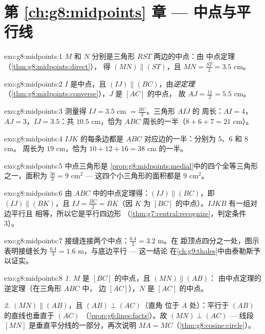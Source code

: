 \section*{第 \ref{ch:g8:midpoints} 章 --- 中点与平行线}

\begin{solution}{exo:g8:midpoints:1}
$M$ 和 $N$ 分别是三角形 $RST$ 两边的中点：由
中点定理（\cref{thm:g8:midpoints:direct}），
得 $(MN) \parallel (ST)$，且 $MN = \frac{ST}{2} = 3.5$ cm。
\end{solution}

\begin{solution}{exo:g8:midpoints:2}
$I$ 是中点，且 $(IJ) \parallel (BC)$，由\emph{逆定理}
（\cref{thm:g8:midpoints:converse}），$J$ 是 $[AC]$ 的中点，
故 $AJ = \frac{11}{2} = 5.5$ cm。
\end{solution}

\begin{solution}{exo:g8:midpoints:3}
测量得 $IJ = 3.5$ cm $= \frac{BC}{2}$。三角形 $AIJ$ 的
周长：$AI = 4$，$AJ = 3$，$IJ = 3.5$：共 $10.5$ cm，恰为
$ABC$ 周长的一半（$8 + 6 + 7 = 21$ cm）。
\end{solution}

\begin{solution}{exo:g8:midpoints:4}
$IJK$ 的每条边都是 $ABC$ 对应边的一半：分别为 $5$、$6$ 和 $8$ cm。
周长为 $19$ cm，恰为 $10 + 12 + 16 = 38$ cm 的一半。
\end{solution}

\begin{solution}{exo:g8:midpoints:5}
中点三角形是
\cref{prop:g8:midpoints:medial}中的四个全等三角形之一，面积为 $\frac{36}{4} = 9$ cm$^2$ ---
这四个小三角形的面积都是 $9$ cm$^2$。
\end{solution}

\begin{solution}{exo:g8:midpoints:6}
由 $ABC$ 中的中点定理得：$(IJ) \parallel (BC)$，即
$(IJ) \parallel (BK)$，且 $IJ = \frac{BC}{2} = BK$（因 $K$ 为
$[BC]$ 的中点）。$IJKB$ 有一组对边平行且
相等，所以它是平行四边形
（\cref{thm:g7:central:recognize}，判定条件 3）。
\end{solution}

\begin{solution}{exo:g8:midpoints:7}
接缝连接两个中点：$\frac{6.4}{2} = 3.2$ m。在
距顶点四分之一处，图示表明接缝长为
$\frac{6.4}{4} = 1.6$ m，与底边平行 --- 这一结论
在\cref{ch:g9:thales}中由泰勒斯予以证实。
\end{solution}

\begin{solution}{exo:g8:midpoints:8}
\emph{1.} $M$ 是 $[BC]$ 的中点，且 $(MN) \parallel (AB)$：
由中点定理的逆定理（在三角形 $ABC$ 中，
边 $[AC]$），$N$ 是 $[AC]$ 的中点。

\emph{2.} $(MN) \parallel (AB)$，且 $(AB) \perp (AC)$（直角
位于 $A$ 处）：平行于 $(AB)$ 的直线也垂直于 $(AC)$
（\cref{prop:g6:lines:facts}）。故 $(MN) \perp (AC)$ --- 线段
$[MN]$ 是垂直平分线的一部分，再次说明
$MA = MC$（\cref{thm:g8:cosine:circle}）。
\end{solution}

